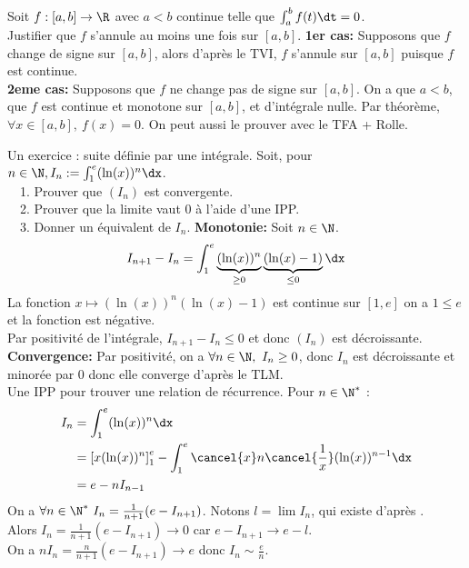 \documentclass[11pt]{article}
\begin{document}
\begin{ex}{}{}
    Soit $f:[a,b]\to\R$ avec $a<b$ continue telle que $\int_a^bf(t)\dt=0$.\\
    Justifier que $f$ s'annule au moins une fois sur $[a,b]$.
    \tcblower
    \textbf{1er cas:} Supposons que $f$ change de signe sur $[a,b]$, alors d'après le TVI, $f$ s'annule sur $[a,b]$ puisque $f$ est continue.\\
    \textbf{2eme cas:} Supposons que $f$ ne change pas de signe sur $[a,b]$. On a que $a<b$, que $f$ est continue et monotone sur $[a,b]$, et d'intégrale nulle. Par théorème, $\forall x \in [a,b], ~ f(x)=0$.\n
    On peut aussi le prouver avec le TFA + Rolle.
\end{ex}

\begin{ex}{Un exercice : suite définie par une intégrale.}{}
    Soit, pour $n\in\N, I_n := \int_1^e(\ln(x))^n\dx$.\\
    \-\ ~1. Prouver que $(I_n)$ est convergente.\\
    \-\ ~2. Prouver que la limite vaut 0 à l'aide d'une IPP.\\
    \-\ ~3. Donner un équivalent de $I_n$.
    \tcblower
     \textbf{Monotonie:} Soit $n\in\N$.
    \begin{equation*}
        I_{n+1} - I_n = \int_1^e\underbrace{(\ln(x))^n}_{\geq0}\underbrace{(\ln(x)-1)}_{\leq0}\dx
    \end{equation*}
    La fonction $x\mapsto (\ln(x))^n(\ln(x)-1)$ est continue sur $[1,e]$ on a $1\leq e$ et la fonction est négative.\\
    Par positivité de l'intégrale, $I_{n+1}-I_n\leq0$ et donc $(I_n)$ est décroissante.\\
    \textbf{Convergence:} Par positivité, on a $\forall n \in \N, ~ I_n \geq 0$, donc $I_n$ est décroissante et minorée par $0$ donc elle converge d'après le TLM.\\
     Une IPP pour trouver une relation de récurrence. Pour $n\in \N^*$ :
    \begin{align*}
        I_n &= \int_1^e(\ln(x))^n\dx\\&=\left[ x(\ln(x))^n \right]_1^e - \int_1^e\cancel{x}n\cancel{\frac{1}{x}}(\ln(x))^{n-1}\dx\\&=e-nI_{n-1}
    \end{align*}
    On a $\forall n \in \N^* ~ I_{n} = \frac{1}{n+1}(e-I_{n+1})$. Notons $l=\lim I_n$, qui existe d'après .\\
    Alors $I_n = \frac{1}{n+1}(e-I_{n+1})\to0$ car $e-I_{n+1}\to e - l$.\\
     On a $nI_n = \frac{n}{n+1}(e-I_{n+1})\to e$ donc $I_n \sim \frac{e}{n}$.
\end{ex}
\end{document}
